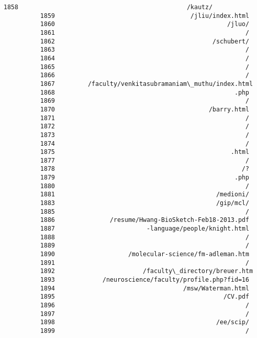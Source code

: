 \documentclass[11pt]{article}
\begin{document}
\begin{Verbatim}[commandchars=\\\{\}]
          1858                                              /kautz/
          1859                                     /jliu/index.html
          1860                                               /jluo/
          1861                                                    /
          1862                                           /schubert/
          1863                                                    /
          1864                                                    /
          1865                                                    /
          1866                                                    /
          1867         /faculty/venkitasubramaniam\_muthu/index.html
          1868                                                 .php
          1869                                                    /
          1870                                          /barry.html
          1871                                                    /
          1872                                                    /
          1873                                                    /
          1874                                                    /
          1875                                                .html
          1877                                                    /
          1878                                                   /?
          1879                                                 .php
          1880                                                    /
          1881                                            /medioni/
          1883                                            /gip/mcl/
          1885                                                    /
          1886               /resume/Hwang-BioSketch-Feb18-2013.pdf
          1887                         -language/people/knight.html
          1888                                                    /
          1889                                                    /
          1890                    /molecular-science/fm-adleman.htm
          1891                                                    /
          1892                        /faculty\_directory/breuer.htm
          1893             /neuroscience/faculty/profile.php?fid=16
          1894                                   /msw/Waterman.html
          1895                                              /CV.pdf
          1896                                                    /
          1897                                                    /
          1898                                            /ee/scip/
          1899                                                    /

\end{Verbatim}
\end{document}
